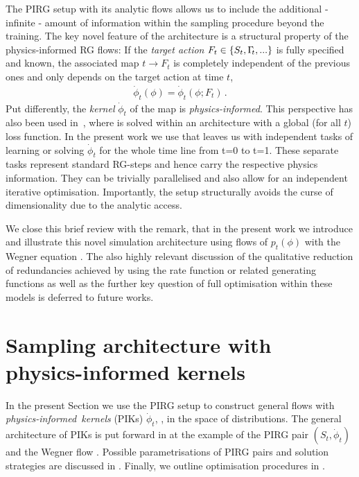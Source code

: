 \documentclass[reprint,amsmath,amssymb,aps,pra,superscriptaddress,nofootinbib,twocolumn,floatfix,nolongbibliography]{revtex4-2}
\begin{document}
The PIRG setup with its analytic flows allows us to include the additional - infinite - amount of information within the sampling procedure beyond the training. The key novel feature of the architecture is a structural property of the physics-informed RG flows: If the \textit{target action} $F_t\in\{S_t, \Gamma_{\hspace{-.07cm}t},...\}$ is fully specified and known, the associated map $t \to F_t$ is completely independent of the previous ones and only depends on the target action at time $t$,
%
\begin{align} 
	\dot\phi_t(\phi)= \dot\phi_t(\phi;F_t)\,.
	\label{eq:PIRG-dotphi}
\end{align} 
%	
Put differently, the \textit{kernel} $\dot\phi_t$ of the map is \textit{physics-informed}. This perspective has also been used in~\cite{Albergo:2025nets}, where  is solved within an architecture with a global (for all $t$) loss function. In the present work we use that  leaves us with independent tasks of learning or solving $\dot \phi_t$ for the whole time line from t=0 to t=1. These separate tasks represent standard RG-steps and hence carry the respective physics information. They can be trivially parallelised and also allow for an independent iterative optimisation. Importantly, the setup structurally avoids the curse of dimensionality due to the analytic access. 

We close this brief review with the remark, that in the present work we introduce and illustrate this novel simulation architecture using flows of $p_t(\phi)$ with the Wegner equation . The also highly relevant discussion of the qualitative reduction of redundancies achieved by using the rate function or related generating functions as well as the further key question of full optimisation within these models is deferred to future works.


\section{Sampling architecture with physics-informed kernels}
\label{sec:PIKs}

In the present Section we use the PIRG setup to construct general flows with \textit{physics-informed kernels} (PIKs) $\dot\phi_t$, , in the space of distributions. The general architecture of PIKs is put forward in  at the example of the PIRG pair $(S_t,\dot\phi_t)$ and the Wegner flow . Possible parametrisations of PIRG pairs and solution strategies are discussed in . Finally, we outline optimisation procedures in . 
\end{document}
